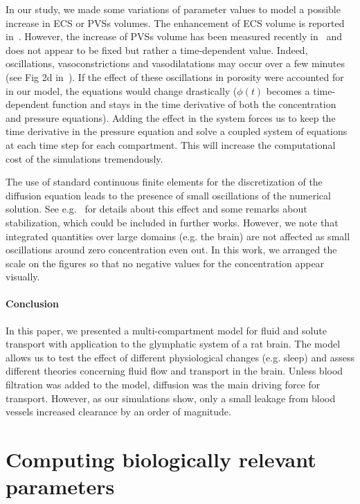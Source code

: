 \documentclass[a4paper,11pt]{article}
\newcommand{\1}{^{(1)}}
\newcommand{\2}{^{(2)}}
\begin{document}
In our study, we made some variations of parameter values to model a possible increase in ECS or PVSs volumes. The enhancement of ECS volume is reported in~\cite{Xie_2013_sleep}. However, the increase of PVSs volume has been measured recently in~\cite{Bojarskaite2022} and does not appear to be fixed but rather a time-dependent value. Indeed, oscillations, vasoconstrictions and vasodilatations may occur over a few minutes (see Fig 2d in~\cite{Bojarskaite2022}). If the effect of these oscillations in porosity were accounted for in our model, the equations would change drastically ($\phi(t)$ becomes a time-dependent function and stays in the time derivative of both the concentration and pressure equations). Adding the effect in the system forces us to keep the time derivative in the pressure equation and solve a coupled system of equations at each time step for each compartment. This will increase the computational cost of the simulations tremendously. 


The use of standard continuous finite elements for the discretization of the diffusion equation leads to the presence of small oscillations of the numerical solution. See e.g.~\cite{Mardal-2022-mri} for details about this effect and some remarks about stabilization, which could be included in further works. However, we note that integrated quantities over large domains (e.g. the brain) are not affected as small oscillations around zero concentration even out. In this work, we arranged the scale on the figures so that no negative values for the concentration appear visually. 


\paragraph{Conclusion}
In this paper, we presented a multi-compartment model for fluid and solute transport with application to the glymphatic system of a rat brain. The model allows us to test the effect of different physiological changes (e.g. sleep) and assess different theories concerning fluid flow and transport in the brain. Unless blood filtration was added to the model, diffusion was the main driving force for transport. However, as our simulations show, only a small leakage from blood vessels increased clearance by an order of magnitude. 


\appendix


\section{Computing biologically relevant parameters} \label{app:param-values}
\end{document}
